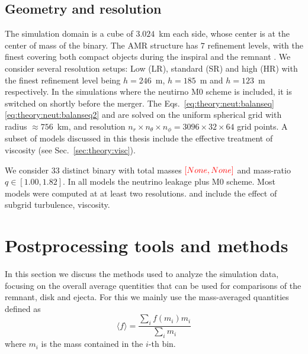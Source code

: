 \subsection{Geometry and resolution}

The simulation domain is a cube of $3.024$~km each side, 
whose center is at the center of mass of the binary.
The \ac{AMR} structure has $7$ refinement levels, with the finest 
covering both compact objects during the inspiral and the remnant \pmerg{}.
%
We consider several resolution setups: Low (LR), 
standard (SR) and high (HR) with the finest refinement level being 
$h=246$~m, $h=185$~m and $h=123$~m respectively.
%
In the simulations where the neutirno M0 scheme is included,
it is switched on shortly before the merger. 
The Eqs.~\eqref{eq:theory:neut:balanseq} \eqref{eq:theory:neut:balanseq2}
and are solved on the uniform spherical grid with radius $\approx 756$~km, 
and resolution $n_r\times n_{\theta}\times n_{\phi} = 3096 \times 32 \times 64$
grid points.
%
A subset of models discussed in this thesis include the effective treatment of viscosity
(see Sec.~\ref{sec:theory:visc}). 

We consider $33$ distinct binary with total masses 
$\textcolor{red}{[None,None]}$ and mass-ratio $q\in[1.00,1.82]$.
In all models the neutrino leakage plus M0 scheme. 
Most models were computed at at least two resolutions. 
and include the effect of subgrid turbulence, viscosity.

%
%
%



\section{Postprocessing tools and methods}

In this section we discuss the methods used to analyze the simulation data,
focusing on the overall average quentities that can be used for comparisons 
of the remnant, disk and ejecta. 
%
For this we mainly use the mass-averaged quantities defined as 
%
\begin{equation}
\langle f \rangle = \frac{\sum_i f(m_i)m_i}{\sum_i m_i}
\end{equation}
%
where $m_i$ is the mass contained in the $i$-th bin.



